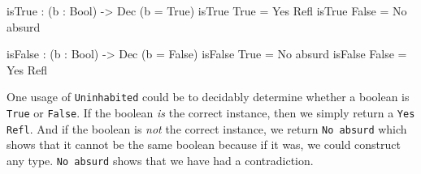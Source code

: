     \begin{code}[caption={Using \texttt{absurd}}]
            isTrue : (b : Bool) -> Dec (b = True)
            isTrue True  = Yes Refl
            isTrue False = No absurd
            
            isFalse : (b : Bool) -> Dec (b = False)
            isFalse True  = No absurd
            isFalse False = Yes Refl
    \end{code}
    One usage of \texttt{Uninhabited} could be to decidably determine whether a boolean is \texttt{True} or \texttt{False}. If the boolean \textit{is} the correct instance, then we simply return a \texttt{Yes Refl}. And if the boolean is \textit{not} the correct instance, we return \texttt{No absurd} which shows that it cannot be the same boolean because if it was, we could construct any type. \texttt{No absurd} shows that we have had a contradiction.
